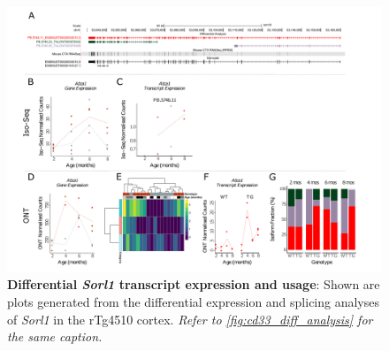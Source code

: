 \begin{landscape}
	\begin{figure}[htp]
		\begin{center}
			\includegraphics[page=16,trim={0 0.5cm 0 1.5cm},scale =0.85]{Figures/TargetGene_DifferentialAnalysis.pdf}
		\end{center}
		\captionsetup{width=1.5\textwidth}
		\caption[Differential \textit{Sorl1} transcript expression and usage]%
		{\textbf{Differential \textit{Sorl1} transcript expression and usage}: Shown are plots generated from the differential expression and splicing analyses of \textit{Sorl1} in the rTg4510 cortex. \textit{Refer to \cref{fig:cd33_diff_analysis} for the same caption.}}   
		\label{fig:Sorl1_diff_analysis}
	\end{figure}
\end{landscape}

